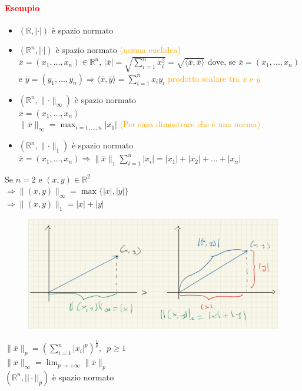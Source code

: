 \documentclass{article}
\newcommand{\R}{\mathbb{R}}
\begin{document}
\paragraph{\textcolor{red}{Esempio}}
\begin{itemize}
    \item $(\R,|\cdot|)$ è spazio normato
    \item $(\R^n, |\cdot|)$ è spazio normato \textcolor{orange}{(norma euclidea)}\\
    $\overline{x}=(x_1,...,x_n)\in \R^n$, $|\overline{x}|=\sqrt{\sum_{i=1}^{n}x_i^2}=\sqrt{\langle \overline{x},\overline{x} \rangle}$ dove, se $\overline{x}=(x_1,...,x_n)$ e $\overline{y}=(y_1,...,y_n) \Rightarrow \langle \overline{x},\overline{y} \rangle = \sum_{i=1}^{n}x_i y_i$ \textcolor{orange}{prodotto scalare tra $\overline{x}$ e $\overline{y}$}
    \item $(\R^n, \parallel\cdot\parallel_{\infty})$ è spazio normato\\
    $\overline{x}=(x_1,...,x_n)$\\
    $\parallel\overline{x}\parallel_\infty = \max_{i=1,...,n} |x_1|$ \textcolor{orange}{(Per casa dimostrare che è una norma)}
    \item $(\R^n,\parallel\cdot\parallel_1)$ è spazio normato\\
    $\overline{x}=(x_1,...,x_n)\Rightarrow \parallel \overline{x}\parallel_1 \sum_{i=1}^{n}|x_i|=|x_1|+|x_2|+...+|x_n|$\\
\end{itemize}
Se $n=2$ e $(x,y)\in\R^2$\\
$\Rightarrow \parallel(x,y)\parallel_\infty=\max \{|x|,|y|\}$\\
$\Rightarrow \parallel(x,y)\parallel_1=|x|+|y|$\\
\begin{figure}[h!]
    \centering
    \includegraphics[width=\textwidth]{Screenshot from 2023-03-22 16-09-06.png}
\end{figure}
$\parallel\overline{x}\parallel_p = \left( \sum_{i=1}^{n}|x_i|^p \right)^{\frac{1}{p}},\,\,\, p \geq 1$\\
$\parallel\overline{x}\parallel_\infty = \lim_{p \rightarrow +\infty} \parallel\overline{x}\parallel_p$\\
$(\R^n,||\cdot||_p)$ è spazio normato
\end{document}
